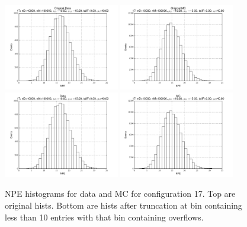  \begin{figure}[htbp] \begin{center} 
\includegraphics[width=0.45\textwidth]{../FIGURES/17/FIG_Original_Data.pdf} 
\includegraphics[width=0.45\textwidth]{../FIGURES/17/FIG_Original_MC.pdf} 
\includegraphics[width=0.45\textwidth]{../FIGURES/17/FIG_Data.pdf} 
\includegraphics[width=0.45\textwidth]{../FIGURES/17/FIG_MC.pdf} 
\caption{NPE histograms for data and MC for configuration 17. Top are original hists. Bottom are hists after truncation at bin containing less than 10 entries with that bin containing overflows.} 
\label{tab:npe_17} 
\end{center} \end{figure} 

 